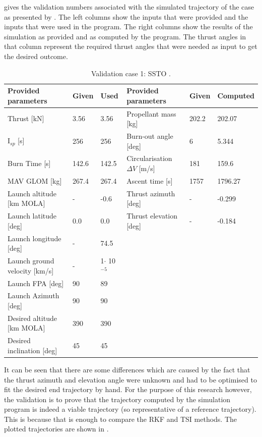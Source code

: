 \noindent
{} gives the validation numbers associated with the simulated trajectory of the case as presented by \cite{woolley2015simple}. The left columns show the inputs that were provided and the inputs that were used in the program. The right columns show the results of the simulation as provided and as computed by the program. The thrust angles in that column represent the required thrust angles that were needed as input to get the desired outcome.


\begin{table}[H]
\begin{center}
\caption{Validation case 1: \ac{SSTO} \cite{woolley2015simple}.}
\label{tab:validationCaseWoolley}
\begin{tabular}{|l|l|l||l||l|l|}
\hline 
\textbf{Provided parameters} & \textbf{Given} & \textbf{Used} & \textbf{Provided parameters} & \textbf{Given} & \textbf{Computed} \\ \hline \hline
Thrust [kN] & 3.56 & 3.56 & Propellant mass [kg] & 202.2 & 202.07 \\ \hline
I$_{sp}$ [s] & 256 & 256 & Burn-out angle [deg] & 6 & 5.344 \\ \hline
Burn Time [s] & 142.6 & 142.5 & Circularisation $\Delta V$ [m/s] & 181 & 159.6 \\ \hline
\ac{MAV} \ac{GLOM} [kg] & 267.4 & 267.4 & Ascent time [s] & 1757 & 1796.27 \\ \hline
Launch altitude [km \ac{MOLA}] & - & -0.6 & Thrust azimuth [deg] & - & -0.299 \\ \hline
Launch latitude [deg] & 0.0 & 0.0 & Thrust elevation [deg] & - & -0.184 \\ \hline
Launch longitude [deg] & - & 74.5 & & & \\ \hline
Launch ground velocity [km/s] & - & 1$\cdot $ 10$^{-5}$ & & & \\ \hline
Launch \ac{FPA} [deg] & 90 & 89 & & & \\ \hline
Launch Azimuth [deg] & 90 & 90 & & & \\ \hline
Desired altitude [km \ac{MOLA}] & 390 & 390 & & & \\ \hline
Desired inclination [deg] & 45 & 45 & & & \\ \hline




\end{tabular}
\end{center}
\end{table}

\noindent
It can be seen that there are some differences which are caused by the fact that the thrust azimuth and elevation angle were unknown and had to be optimised to fit the desired end trajectory by hand. For the purpose of this research however, the validation is to prove that the trajectory computed by the simulation program is indeed a viable trajectory (so representative of a reference trajectory). This is because that is enough to compare the \ac{RKF} and \ac{TSI} methods. The plotted trajectories are shown in .


